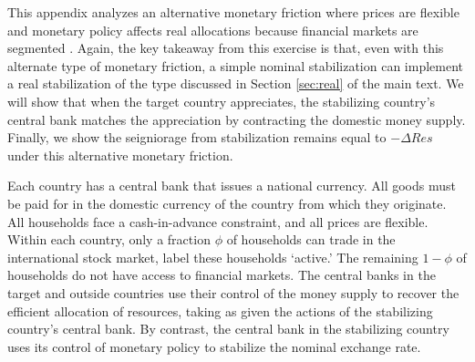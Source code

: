 This appendix analyzes an alternative monetary friction where prices
are flexible and monetary policy affects real allocations because
financial markets are segmented \citep{AlvarezAtkesonKehoe2002}.
Again, the key takeaway from this exercise is that, even with this
alternate type of monetary friction, a simple nominal stabilization
can implement a real stabilization of the type discussed in Section
\ref{sec:real} of the main text. We will show that when the target
country appreciates, the stabilizing country's central bank matches
the appreciation by contracting the domestic money supply. Finally, we
show the seigniorage from stabilization remains equal to $-\Delta Res$
under this alternative monetary friction.

Each country has a central bank that issues a national currency. All
goods must be paid for in the domestic currency of the country from
which they originate. All households face a cash-in-advance
constraint, and all prices are flexible. Within each country, only a
fraction $\phi$ of households can trade in the international stock
market, label these households `active.' The remaining $1- \phi$ of
households do not have access to financial markets. The central banks
in the target and outside countries use their control of the money
supply to recover the efficient allocation of resources, taking as
given the actions of the stabilizing country's central bank. By
contrast, the central bank in the stabilizing country uses its control
of monetary policy to stabilize the nominal exchange rate.

